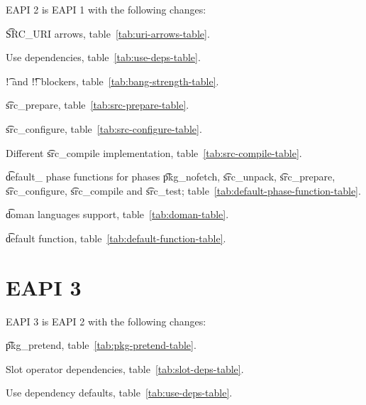 EAPI 2 is EAPI 1 with the following changes:

\begin{compactitem}
\item \t{SRC\_URI} arrows, table~\ref{tab:uri-arrows-table}.
\item Use dependencies, table~\ref{tab:use-deps-table}.
\item \t{!} and \t{!!} blockers, table~\ref{tab:bang-strength-table}.
\item \t{src\_prepare}, table~\ref{tab:src-prepare-table}.
\item \t{src\_configure}, table~\ref{tab:src-configure-table}.
\item Different \t{src\_compile} implementation, table~\ref{tab:src-compile-table}.
\item \t{default\_} phase functions for phases \t{pkg\_nofetch}, \t{src\_unpack}, \t{src\_prepare},
    \t{src\_configure}, \t{src\_compile} and \t{src\_test}; table~\ref{tab:default-phase-function-table}.
\item \t{doman} languages support, table~\ref{tab:doman-table}.
\item \t{default} function, table~\ref{tab:default-function-table}.
\end{compactitem}

\section*{EAPI 3}

EAPI 3 is EAPI 2 with the following changes:

\begin{compactitem}
\item \t{pkg\_pretend}, table~\ref{tab:pkg-pretend-table}.
\item Slot operator dependencies, table~\ref{tab:slot-deps-table}.
\item Use dependency defaults, table~\ref{tab:use-deps-table}.
\end{compactitem}


